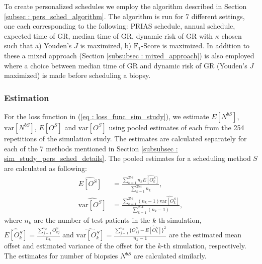 To create personalized schedules we employ the algorithm described in Section \ref{subsec : pers_sched_algorithm}. The algorithm is run for 7 different settings, one each corresponding to the following: PRIAS schedule, annual schedule, expected time of GR, median time of GR, dynamic risk of GR with $\kappa$ chosen such that a) Youden's $J$ is maximized, b) $\text{F}_1$-Score is maximized. In addition to these a mixed approach (Section \ref{subsubsec : mixed_approach}) is also employed where a choice between median time of GR and dynamic risk of GR (Youden's $J$ maximized) is made before scheduling a biopsy.

\subsubsection{Estimation}
For the loss function in (\ref{eq : loss_func_sim_study}), we estimate $E[N^{bS}]$, $\mbox{var}[N^{bS}]$, $E[O^S]$ and $\mbox{var}[O^S]$ using pooled estimates of each from the 254 repetitions of the simulation study. The estimates are calculated separately for each of the 7 methods mentioned in Section \ref{subsubsec : sim_study_pers_sched_details}. The pooled estimates for a scheduling method $S$ are calculated as following:
\begin{align*}
\widehat{E[O^S]} &= \frac{\sum_{k=1}^{254} n_k \widehat{E[O^S_k]}}{\sum_{k=1}^{254} n_k}, \\
\widehat{\mbox{var}[O^S]} &= \frac{\sum_{k=1}^{254} (n_k - 1) \widehat{\mbox{var}[O^S_k]}}{\sum_{k=1}^{254} (n_k-1)}, 
\end{align*}
where $n_k$ are the number of test patients in the $k$-th simulation, $\widehat{E[O^S_k]} = \frac{\sum_{j=1}^{n_k}O^S_{kj}}{n_k}$ and $\widehat{\mbox{var}[O^S_k]} = \frac{\sum_{j=1}^{n_k}\big\{O^S_{kj} - \widehat{E[O^S_k]}\big\}^2}{n_k-1}$ are the estimated mean offset and estimated variance of the offset for the $k$-th simulation, respectively. The estimates for number of biopsies $N^{bS}$ are calculated similarly.


